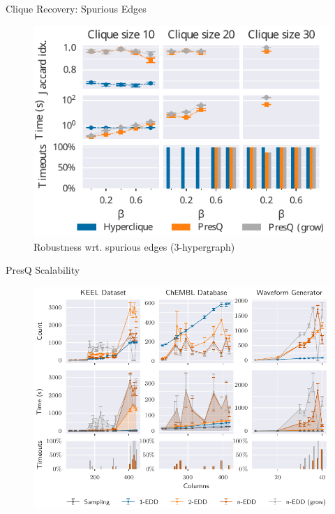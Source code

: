 \documentclass[10pt]{beamer}
\begin{document}
\begin{frame}{Clique Recovery: Spurious Edges}
    \begin{figure}
        \centering
        \includegraphics{3hyper_beta}
        \caption{Robustness wrt. spurious edges (3-hypergraph)}
    \end{figure}
\end{frame}

\begin{frame}{PresQ Scalability}
\begin{figure}
    \centering
    \includegraphics[width=\textwidth]{scalability.pdf}
\end{figure}
\end{frame}
\end{document}
